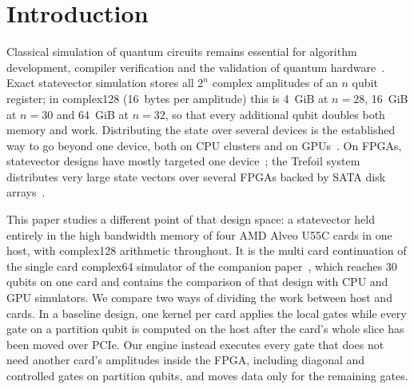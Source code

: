 \section{Introduction}\label{sec:introduction}

Classical simulation of quantum circuits remains essential for algorithm development, compiler verification and
the validation of quantum hardware~\cite{preskill2018nisq,arute2019supremacy}. Exact statevector simulation stores all
$2^n$ complex amplitudes of an $n$ qubit register; in complex128 (16~bytes per amplitude) this is 4~GiB at $n=28$, 16~GiB
at $n=30$ and 64~GiB at $n=32$, so that every additional qubit doubles both memory and work. Distributing the state
over several devices is the established way to go beyond one device, both on CPU clusters and on
GPUs~\cite{smelyanskiy2016qhipster,jones2019quest,haner2017petabyte,deraedt2019massively,imamura2022mpiqulacs,bayraktar2023cuquantum}.
On FPGAs, statevector designs have mostly targeted one device~\cite{khalid2004fpga,lee2016fpga,pilch2019fpga,mahmud2019scaling,pcq2024,tiwari2026fpga30};
the Trefoil system distributes very large state vectors over several FPGAs backed by SATA disk arrays~\cite{niwase2023trefoil,wei2025qutrefoil}.

This paper studies a different point of that design space: a statevector held entirely in the high bandwidth memory
of four AMD Alveo U55C cards in one host, with complex128 arithmetic throughout. It is the multi card continuation of
the single card complex64 simulator of the companion paper~\cite{tiwari2026fpga30}, which reaches 30 qubits on one card
and contains the comparison of that design with CPU and GPU simulators. We compare two ways of dividing the work
between host and cards. In a baseline design, one kernel per card applies the local gates while every gate on a
partition qubit is computed on the host after the card's whole slice has been moved over PCIe. Our engine instead
executes every gate that does not need another card's amplitudes inside the FPGA, including diagonal and controlled
gates on partition qubits, and moves data only for the remaining gates.

